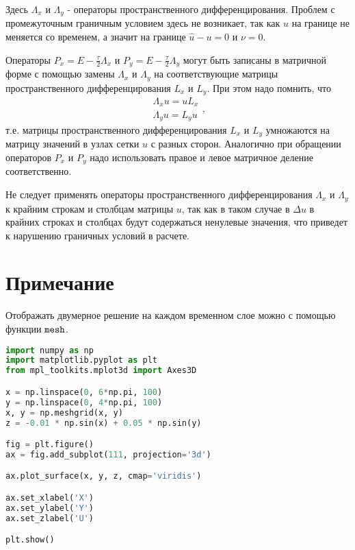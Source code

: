 \documentclass{report}
\begin{document}
Здесь $\Lambda_x$ и $\Lambda_y$ - операторы пространственного дифференцирования. Проблем с промежуточным граничным условием здесь не возникает, так как $u$ на границе не меняется со временем, а значит на границе $\hat{u} - u = 0$ и $\nu = 0$.

Операторы $P_x = E - \frac{\tau}{2} \Lambda_x$ и $P_y = E - \frac{\tau}{2} \Lambda_y$ могут быть записаны в матричной форме с помощью замены $\Lambda_x$ и $\Lambda_y$ на соответствующие матрицы пространственного дифференцирования $L_x$ и $L_y$. При этом надо помнить, что
\begin{equation} \label{c10eq3}
	\begin{split}
		\Lambda_x u = u L_x \\
		\Lambda_y u = L_y u
	\end{split},
\end{equation}
т.е. матрицы пространственного дифференцирования $L_x$ и $L_y$ умножаются на матрицу значений в узлах сетки $u$ с  разных сторон. Аналогично при обращении операторов $P_x$ и $P_y$ надо использовать правое и левое матричное деление соответственно.

Не следует применять операторы пространственного дифференцирования $\Lambda_x$ и $\Lambda_y$ к крайним строкам и столбцам матрицы $u$, так как в таком случае в $\Delta u$ в крайних строках и столбцах будут содержаться ненулевые значения, что приведет к нарушению граничных условий в расчете.

\section*{Примечание}

Отображать двумерное решение на каждом временном слое можно с помощью функции $\texttt{\lstinline|mesh|}$.

\begin{lstlisting}[language=Python]
import numpy as np
import matplotlib.pyplot as plt
from mpl_toolkits.mplot3d import Axes3D

x = np.linspace(0, 6*np.pi, 100)
y = np.linspace(0, 4*np.pi, 100)
x, y = np.meshgrid(x, y)
z = -0.01 * np.sin(x) + 0.05 * np.sin(y)

fig = plt.figure()
ax = fig.add_subplot(111, projection='3d')

ax.plot_surface(x, y, z, cmap='viridis')

ax.set_xlabel('X')
ax.set_ylabel('Y')
ax.set_zlabel('U')

plt.show()

\end{lstlisting}
\end{document}
